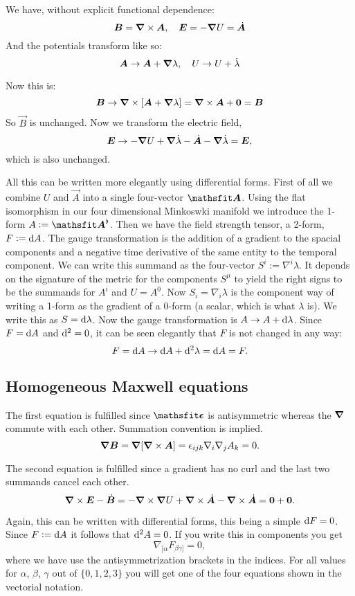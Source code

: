 \documentclass[11pt, ngerman, fleqn, DIV=15, headinclude, BCOR=1cm]{scrartcl}
\begin{document}
We have, without explicit functional dependence:
\[
    \boldsymbol{B} = \boldsymbol{\nabla} \times \boldsymbol{A}
    ,\quad
    \boldsymbol{E} = - \boldsymbol{\nabla} U = \dot{\boldsymbol{A}}
\]
And the potentials transform like so:
\[
    \boldsymbol{A} \to \boldsymbol{A} + \boldsymbol{\nabla} \lambda
    ,\quad
    U \to U + \dot \lambda
\]

Now this is:
\[
    \vec B \to \curl \sbr{\vec A + \vnabla \lambda} = \curl \vec A + \vec 0 =
    \vec B
\]
So $\vec B$ is unchanged. Now we transform the electric field,
\[
    \boldsymbol{E} \to - \boldsymbol{\nabla} U + \boldsymbol{\nabla} \dot \lambda - \dot{\boldsymbol{A}} - \boldsymbol{\nabla} \dot
    \lambda = \boldsymbol{E},
\]
which is also unchanged.

All this can be written more elegantly using differential forms. First of all
we combine $U$ and $\vec A$ into a single four-vector $\tens A$. Using the flat
isomorphism in our four dimensional Minkoswki manifold we introduce the 1-form
$A := \tens A^\flat$. Then we have the field strength tensor, a 2-form, $F :=
\dif A$. The gauge transformation is the addition of a gradient to the spacial
components and a negative time derivative of the same entity to the temporal
component. We can write this summand as the four-vector $S^i := \nabla^i
\lambda$. It depends on the signature of the metric for the components $S^\mu$
to yield the right signs to be the summands for $A^i$ and $U = A^0$. Now $S_i =
\nabla_i \lambda$ is the component way of writing a 1-form as the gradient of a
0-form (a scalar, which is what $\lambda$ is). We write this as $S = \dif
\lambda$. Now the gauge transformation is $A \to A + \dif \lambda$. Since $F =
\dif A$ and $\dif{^2} = 0$, it can be seen elegantly that $F$ is not changed in
any way:
\[
    F = \dif A \to \dif A + \dif{^2} \lambda = \dif A = F.
\]

\subsection{Homogeneous Maxwell equations}

The first equation is fulfilled since $\tens \epsilon$ is antisymmetric whereas
the $\boldsymbol{\nabla}$ commute with each other. Summation convention is implied.
\[
    \boldsymbol{\nabla} \boldsymbol{B} = \boldsymbol{\nabla} [\boldsymbol{\nabla} \times \boldsymbol{A}] = \epsilon_{ijk} \nabla_i
    \nabla_j A_k = 0.
\]

The second equation is fulfilled since a gradient has no curl and the last two
summands cancel each other.
\[
    \boldsymbol{\nabla} \times \boldsymbol{E} - \dot{\boldsymbol{B}} = - \boldsymbol{\nabla} \times \boldsymbol{\nabla} U + \boldsymbol{\nabla} \times \dot{\boldsymbol{A}} - \boldsymbol{\nabla} \times
    \dot{\boldsymbol{A}} = \boldsymbol{0} + \boldsymbol{0}.
\]

Again, this can be written with differential forms, this being a simple $\dif F
= 0$. Since $F := \dif A$ it follows that $\dif{^2} A = 0$. If you write this
in components you get
\[
    \nabla_{[\alpha} F_{\beta\gamma]} = 0,
\]
where we have use the antisymmetrization brackets in the indices. For all
values for $\alpha$, $\beta$, $\gamma$ out of $\{0, 1, 2, 3\}$ you will get one
of the four equations shown in the vectorial notation.
\end{document}
